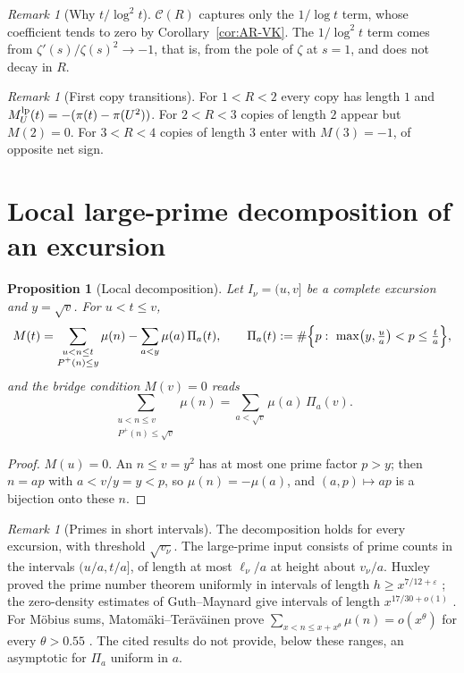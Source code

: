 \documentclass[11pt]{amsart}
\numberwithin{equation}{section}
\theoremstyle{plain}
\newtheorem{proposition}[theorem]{Proposition}
\theoremstyle{definition}
\theoremstyle{remark}
\newtheorem{remark}[theorem]{Remark}
\newcommand{\eps}{\varepsilon}
\newcommand{\Pp}{P^{+}}
\newcommand{\Cc}{\mathcal{C}}
\begin{document}
\begin{remark}[Why $t/\log^2t$]
\label{rem:why_log2}
$\Cc(R)$ captures only the $1/\log t$ term, whose coefficient tends to zero
by Corollary~\ref{cor:AR-VK}. The $1/\log^2t$ term comes from
$\zeta'(s)/\zeta(s)^2\to-1$, that is, from the pole of $\zeta$ at $s=1$,
and does not decay in $R$.
\end{remark}

\begin{remark}[First copy transitions]
\label{rem:first-copy-transitions}
For $1<R<2$ every copy has length $1$ and $M^{\rm lp}_U(t)=-(\pi(t)-\pi(U^2))$. For
$2<R<3$ copies of length $2$ appear but $M(2)=0$. For $3<R<4$ copies of
length $3$ enter with $M(3)=-1$, of opposite net sign.
\end{remark}

\section{Local large-prime decomposition of an excursion}
\label{sec:local_large_prime}

\begin{proposition}[Local decomposition]
\label{prop:local_large_prime}
Let $I_\nu=(u,v]$ be a complete excursion and $y=\sqrt v$. For $u<t\le v$,
\begin{equation}
\label{eq:local_split}
  M(t)=\sum_{\substack{u<n\le t\\ \Pp(n)\le y}}\mu(n)
  -\sum_{a<y}\mu(a)\,\Pi_a(t),\qquad
  \Pi_a(t):=\#\Bigl\{p:\ \max\bigl(y,\tfrac ua\bigr)<p\le\tfrac ta\Bigr\},
\end{equation}
and the bridge condition $M(v)=0$ reads
\begin{equation}
\label{eq:local_bridge}
  \sum_{\substack{u<n\le v\\ \Pp(n)\le\sqrt v}}\mu(n)
  =\sum_{a<\sqrt v}\mu(a)\,\Pi_a(v).
\end{equation}
\end{proposition}

\begin{proof}
$M(u)=0$. An $n\le v=y^2$ has at most one prime factor $p>y$; then
$n=ap$ with $a<v/y=y<p$, so $\mu(n)=-\mu(a)$, and $(a,p)\mapsto ap$ is a
bijection onto these $n$.
\end{proof}

\begin{remark}[Primes in short intervals]
\label{rem:local_meaning}
The decomposition holds for every excursion, with threshold $\sqrt{v_\nu}$.
The large-prime input consists of prime counts in the intervals
$(u/a,t/a]$, of length at most $\ell_\nu/a$ at height about $v_\nu/a$.
Huxley proved the prime number theorem uniformly in intervals of length
$h\ge x^{7/12+\eps}$ \cite{Huxley1972}; the zero-density estimates of
Guth--Maynard give intervals of length $x^{17/30+o(1)}$
\cite{GuthMaynard2024}. For M\"obius sums, Matom\"aki--Ter\"av\"ainen prove
$\sum_{x<n\le x+x^\theta}\mu(n)=o(x^\theta)$ for every $\theta>0.55$
\cite{MatomakiTeravainen2023}. The cited results do not provide, below these ranges, an asymptotic for
$\Pi_a$ uniform in $a$.
\end{remark}
\end{document}
